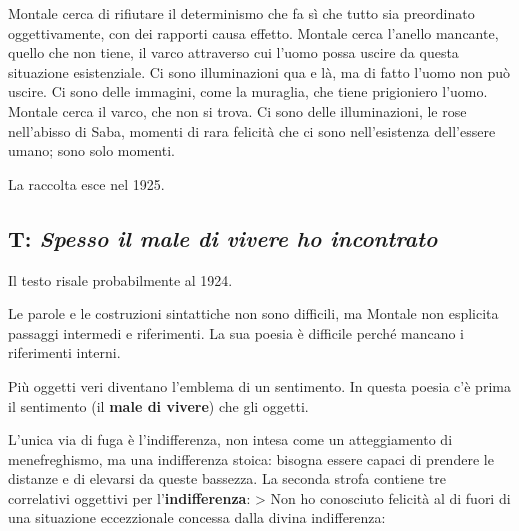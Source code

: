 Montale cerca di rifiutare il determinismo che fa sì che tutto sia preordinato oggettivamente, con dei rapporti causa effetto. Montale cerca l'anello mancante, quello che non tiene, il varco attraverso cui l'uomo possa uscire da questa situazione esistenziale. Ci sono illuminazioni qua e là, ma di fatto l'uomo non può uscire.
Ci sono delle immagini, come la muraglia, che tiene prigioniero l'uomo. Montale cerca il varco, che non si trova. Ci sono delle illuminazioni, le rose nell'abisso di Saba, momenti di rara felicità che ci sono nell'esistenza dell'essere umano; sono solo momenti.

La raccolta esce nel 1925.

\subsection{T: \textit{Spesso il male di vivere ho incontrato}}


Il testo risale probabilmente al 1924.

Le parole e le costruzioni sintattiche non sono difficili, ma Montale non esplicita passaggi intermedi e riferimenti. La sua poesia è difficile perché mancano i riferimenti interni.

Più oggetti veri diventano l'emblema di un sentimento. In questa poesia c'è prima il sentimento (il \textbf{male di vivere}) che gli oggetti.

L'unica via di fuga è l'indifferenza, non intesa come un atteggiamento di menefreghismo, ma una indifferenza stoica: bisogna essere capaci di prendere le distanze e di elevarsi da queste bassezza.
La seconda strofa contiene tre correlativi oggettivi per l'\textbf{indifferenza}:
> Non ho conosciuto felicità al di fuori di una situazione eccezzionale concessa dalla divina indifferenza:

